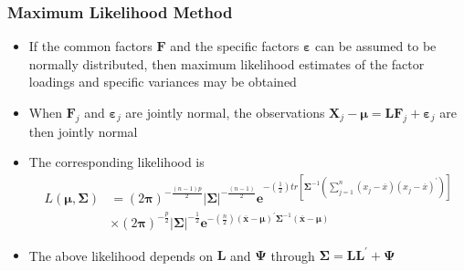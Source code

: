 \documentclass[10pt]{beamer} %
\begin{document}
\begin{frame}
   \frametitle{Maximum Likelihood Method}
   \begin{itemize}
      \item If the common factors $\mathbf{F}$ and the specific factors
         $\boldsymbol{\varepsilon}$ can be assumed to be normally distributed,
         then maximum likelihood estimates of the factor loadings and specific
         variances may be obtained
         \vspace{0.45cm}
      \item When $\mathbf{F}_j$ and $\boldsymbol{\varepsilon}_j$ are jointly
         normal, the observations $\mathbf{X}_j-\boldsymbol{\mu} =
         \mathbf{L}\mathbf{F}_j+\boldsymbol{\varepsilon}_j$ are then jointly normal
         \vspace{0.45cm}
      \item The corresponding likelihood is
         \begin{align*}
            \mathit{L}(\boldsymbol{\mu},\boldsymbol{\Sigma}) & = \left(2\boldsymbol{\pi}\right)^{-\frac{(n-1)p}{2}}|\boldsymbol{\Sigma}|^{-\frac{(n-1)}{2}}\mathbf{e}^{-\left(\frac{1}{2}\right)tr\left[\boldsymbol{\Sigma}^{-1}\left(\sum_{j=1}^{n} (x_j-\overline{x})(x_j-\overline{x})^{'}\right)\right]} \\ & \times \left(2\boldsymbol{\pi}\right)^{-\frac{p}{2}}|\boldsymbol{\Sigma}|^{-\frac{1}{2}}\mathbf{e}^{-\left(\frac{n}{2}\right)(\overline{\mathbf{x}}-\boldsymbol{\mu})^{'}\boldsymbol{\Sigma}^{-1}(\overline{\mathbf{x}}-\boldsymbol{\mu})}
         \end{align*}
      \item The above likelihood depends on  $\mathbf{L}$ and
         $\boldsymbol{\Psi}$ through $\boldsymbol{\Sigma} =
         \mathbf{L}\mathbf{L}^{'}+\boldsymbol{\Psi}$
   \end{itemize}    
\end{frame}
\end{document}
